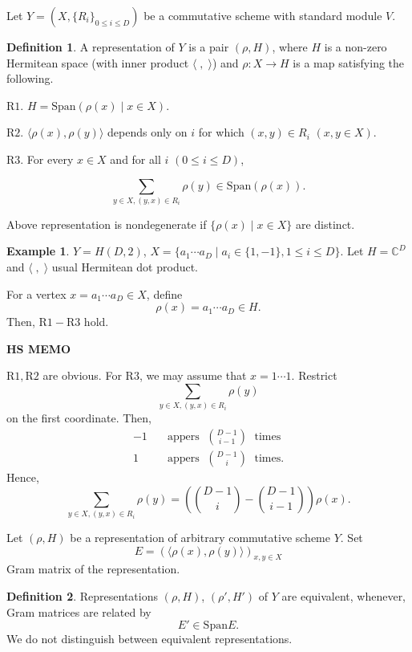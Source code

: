 \documentclass[
]{book}
\theoremstyle{definition}
\newtheorem{definition}{Definition}[chapter]
\theoremstyle{definition}
\newtheorem{example}{Example}[chapter]
\theoremstyle{definition}
\theoremstyle{definition}
\theoremstyle{remark}
\begin{document}
Let \(Y = (X, \{R_i\}_{0\leq i\leq D})\) be a commutative scheme with standard module \(V\).

\begin{definition}
\protect\hypertarget{def:representation-of-y}{}\label{def:representation-of-y}A representation of \(Y\) is a pair \((\rho, H)\), where \(H\) is a non-zero Hermitean space (with inner product \(\langle \;, \;\rangle\)) and
\(\rho: X\to H\) is a map satisfying the following.

\(\mathrm{R1}\). \(H = \mathrm{Span}(\rho(x)\mid x\in X)\).

\(\mathrm{R2}\). \(\langle \rho(x), \rho(y)\rangle\) depends only on \(i\) for which \((x,y)\in R_i\) \((x,y\in X)\).

\(\mathrm{R3}\). For every \(x\in X\) and for all \(i\) \((0\leq i\leq D)\),

\[\sum_{y\in X, (y,x)\in R_i}\rho(y)\in \mathrm{Span}(\rho(x)).\]

Above representation is nondegenerate if \(\{\rho(x)\mid x\in X\}\) are distinct.
\end{definition}

\begin{example}
\protect\hypertarget{exm:representation-of-hd2}{}\label{exm:representation-of-hd2}\(Y = H(D,2)\), \(X = \{a_1\cdots a_D\mid a_i\in \{1,-1\}, 1\leq i\leq D\}\).
Let \(H = \mathbb{C}^D\) and \(\langle \;, \;\rangle\) usual Hermitean dot product.

For a vertex \(x = a_1\cdots a_D\in X\), define
\[\rho(x) = a_1\cdots a_D\in H.\]
Then, \(\mathrm{R1}-\mathrm{R3}\) hold.
\end{example}

\textbf{HS MEMO}

\(\mathrm{R1}, \mathrm{R2}\) are obvious.
For \(\mathrm{R3}\), we may assume that \(x = 1\cdots 1\).
Restrict
\[\sum_{y\in X, (y,x)\in R_i}\rho(y)\]
on the first coordinate. Then,
\begin{align}
-1 & \quad \text{appers }\; \binom{D-1}{i-1} \;\text{ times}\\
1 & \quad \text{appers } \;\binom{D-1}{i} \;\text{ times}.
\end{align}
Hence,
\[\sum_{y\in X, (y,x)\in R_i}\rho(y) = \left(\binom{D-1}{i} - \binom{D-1}{i-1}\right)\rho(x).\]

Let \((\rho, H)\) be a representation of arbitrary commutative scheme \(Y\). Set
\[E = (\langle \rho(x),\rho(y)\rangle)_{x,y\in X}\]
Gram matrix of the representation.

\begin{definition}
\protect\hypertarget{def:equivalence-of-representation}{}\label{def:equivalence-of-representation}Representations \((\rho, H)\), \((\rho', H')\) of \(Y\) are equivalent, whenever, Gram matrices are related by
\[E'\in \mathrm{Span} E.\]
We do not distinguish between equivalent representations.
\end{definition}
\end{document}
